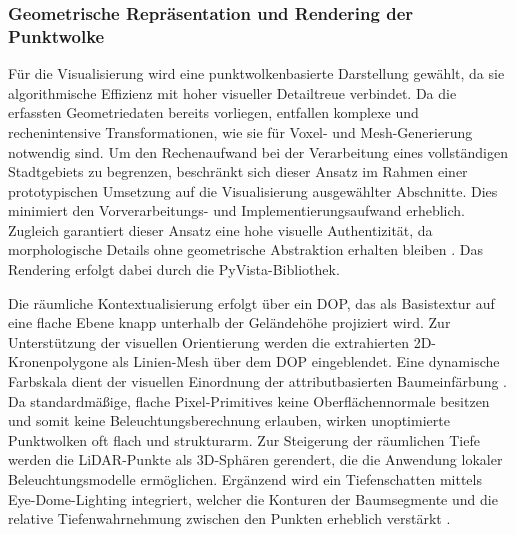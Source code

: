 \subsubsection{Geometrische Repräsentation und Rendering der Punktwolke}

Für die Visualisierung wird eine punktwolkenbasierte Darstellung gewählt, da sie algorithmische Effizienz mit hoher visueller Detailtreue verbindet. Da die erfassten Geometriedaten bereits vorliegen, entfallen komplexe und rechenintensive Transformationen, wie sie für Voxel- und Mesh-Generierung notwendig sind. Um den Rechenaufwand bei der Verarbeitung eines vollständigen Stadtgebiets zu begrenzen, beschränkt sich dieser Ansatz im Rahmen einer prototypischen Umsetzung auf die Visualisierung ausgewählter Abschnitte. Dies minimiert den Vorverarbeitungs- und Implementierungsaufwand erheblich. Zugleich garantiert dieser Ansatz eine hohe visuelle Authentizität, da morphologische Details ohne geometrische Abstraktion erhalten bleiben \cite{wangAutomatedPhenotypicTrait2024}. Das Rendering erfolgt dabei durch die PyVista-Bibliothek.

Die räumliche Kontextualisierung erfolgt über ein DOP, das als Basistextur auf eine flache Ebene knapp unterhalb der Geländehöhe projiziert wird. Zur Unterstützung der visuellen Orientierung werden die extrahierten 2D-Kronenpolygone als Linien-Mesh über dem DOP eingeblendet. Eine dynamische Farbskala dient der visuellen Einordnung der attributbasierten Baumeinfärbung \cite{kempfObliqueViewIndividual2021}. Da standardmäßige, flache Pixel-Primitives keine Oberflächennormale besitzen und somit keine Beleuchtungsberechnung erlauben, wirken unoptimierte Punktwolken oft flach und strukturarm. Zur Steigerung der räumlichen Tiefe werden die LiDAR-Punkte als 3D-Sphären gerendert, die die Anwendung lokaler Beleuchtungsmodelle ermöglichen. Ergänzend wird ein Tiefenschatten mittels Eye-Dome-Lighting integriert, welcher die Konturen der Baumsegmente und die relative Tiefenwahrnehmung zwischen den Punkten erheblich verstärkt \cite{wegenNonPhotorealisticRendering3D2024}.

